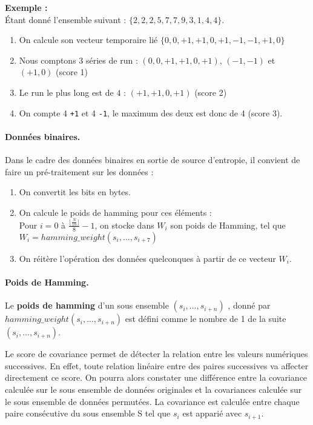 \textbf{Exemple :} \\
Étant donné l'ensemble suivant : $\lbrace 2, 2, 2, 5, 7, 7, 9, 3, 1, 4, 4 \rbrace$. 
\begin{enumerate}
\item  On calcule son vecteur temporaire lié $ \lbrace 0, 0, +1, +1, 0, +1, -1, -1, +1, 0 \rbrace $
\item Nous comptons 3 séries de run : $(0,0,+1,+1,0,+1)$, $(-1,-1)$ et $(+1,0)$ (score 1)
\item Le run le plus long est de $4$ : $(+1,+1,0,+1)$ (score 2)
\item On compte 4 \texttt{+1} et 4 \texttt{-1}, le maximum des deux est donc de 4 (score 3).
\end{enumerate}


\paragraph{Données binaires.\\}
Dans le cadre des données binaires en sortie de source d'entropie, il convient de faire un pré-traitement sur les données : 
\begin{enumerate}
\item On convertit les bits en bytes.
\item On calcule le poids de hamming pour ces éléments : \\
Pour $i=0$ à  $\frac{\lfloor\frac{N}{10}\rfloor}{8} -1 $, on stocke dans $W_i$ son poids de Hamming, tel que $W_i=hamming\_weight(s_i,...,s_{i+7})$
\item On réitère l'opération des données quelconques à partir de ce vecteur $W_i$.
\end{enumerate}

\paragraph{Poids de Hamming.\\}
Le \textbf{poids de hamming} d'un sous ensemble $(s_i,...,s_{i+n})$ , donné par $hamming\_weight(s_i,...,s_{i+n})$ est défini comme le nombre de 1 de la suite $(s_i,...,s_{i+n})$.



Le score de covariance permet de détecter la relation entre les valeurs numériques successives. En effet, toute relation linéaire entre des paires successives va affecter directement ce score. On pourra alors constater une différence entre la covariance calculée sur le sous ensemble de données originales et la covariances calculée sur le sous ensemble de données permutées. La covariance est calculée entre chaque paire consécutive du sous ensemble S tel que $s_i$ est apparié avec $s_{i+1}$.\\

